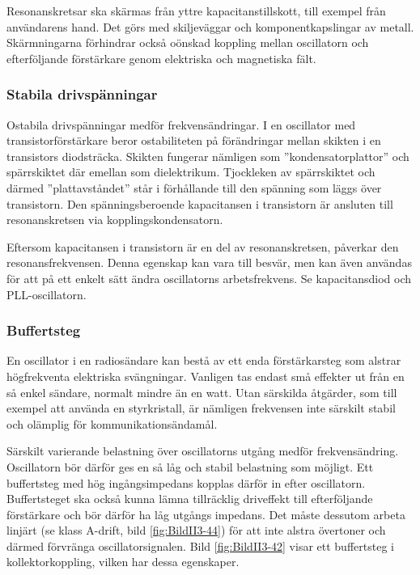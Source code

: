 Resonanskretsar ska skärmas från yttre kapacitanstillskott, till exempel från 
användarens hand.
Det görs med skiljeväggar och komponentkapslingar av metall.
Skärmningarna förhindrar också oönskad koppling mellan oscillatorn och
efterföljande förstärkare genom elektriska och magnetiska fält.

\subsubsection{Stabila drivspänningar}

Ostabila drivspänningar medför frekvensändringar.
I en oscillator med transistorförstärkare beror ostabiliteten på förändringar
mellan skikten i en transistors diodsträcka.
Skikten fungerar nämligen som ''kondensatorplattor'' och spärrskiktet där
emellan som dielektrikum.
Tjockleken av spärrskiktet och därmed ''plattavståndet'' står i förhållande
till den spänning som läggs över transistorn.
Den spänningsberoende kapacitansen i transistorn är ansluten till
resonanskretsen via kopplingskondensatorn.

Eftersom kapacitansen i transistorn är en del av resonanskretsen, påverkar
den resonansfrekvensen.
Denna egenskap kan vara till besvär, men kan även användas för att på ett
enkelt sätt ändra oscillatorns arbetsfrekvens.
Se kapacitansdiod och PLL-oscillatorn.

\subsubsection{Buffertsteg}

En oscillator i en radiosändare kan bestå av ett enda förstärkarsteg
som alstrar högfrekventa elektriska svängningar.
Vanligen tas endast små effekter ut från en så enkel sändare, normalt mindre än
en watt.
Utan särskilda åtgärder, som till exempel att använda en styrkristall, är nämligen
frekvensen inte särskilt stabil och olämplig för kommunikationsändamål.

Särskilt varierande belastning över oscillatorns utgång medför frekvensändring.
Oscillatorn bör därför ges en så låg och stabil belastning som möjligt.
Ett buffertsteg med hög ingångsimpedans kopplas därför in efter oscillatorn.
Buffertsteget ska också kunna lämna tillräcklig driveffekt till efterföljande 
förstärkare och bör därför ha låg utgångs impedans.
Det måste dessutom arbeta linjärt (se klass A-drift, bild \ref{fig:BildII3-44})
för att inte alstra övertoner och därmed förvränga oscillatorsignalen.
Bild \ref{fig:BildII3-42} visar ett buffertsteg i kollektorkoppling, vilken har
dessa egenskaper.


